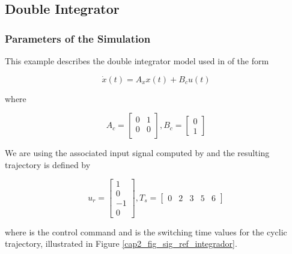 \subsection{Double Integrator}
\label{cap4_aplication_integrador}


\subsubsection{Parameters of the Simulation}

This example describes the double integrator model used in  of the form

\begin{equation}
    \dot{x}(t) = A_x x(t) + B_c u(t)
\end{equation}

\noindent
where

\begin{equation}
    \label{cap4_eq_dynamics_integrador}
    A_c = \left[
        \begin{matrix}
            0 & 1 \\
            0 & 0 \\
        \end{matrix}
    \right],
    B_c = \left[
        \begin{matrix}
            0 \\
            1
        \end{matrix}
    \right]
\end{equation}

We are using the associated input signal computed by  and 
the resulting trajectory is defined by

\begin{equation}
    \label{cap4_eq_signal_integrador}
    u_r = \left[
        \begin{matrix}
            1 \\
            0 \\
            -1 \\
            0
        \end{matrix}
    \right],
    T_s = \left[
        \begin{matrix}
            0 &
            2 &
            3 &
            5 &
            6
        \end{matrix}
    \right]
\end{equation}

\noindent
where  is the control command and  is the switching time values for the cyclic trajectory,
illustrated in Figure \ref{cap2_fig_sig_ref_integrador}.

